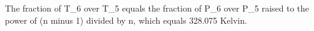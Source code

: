 The fraction of T_6 over T_5 equals the fraction of P_6 over P_5 raised to the power of (n minus 1) divided by n, which equals 328.075 Kelvin.
